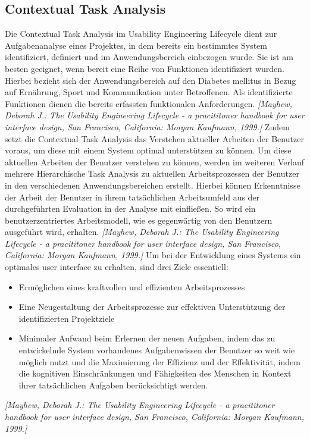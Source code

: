 \documentclass[a4paper,11pt]{article}%
\renewcommand{\\}{\vspace*{0.5\baselineskip} \newline}
\begin{document}
\subsection{Contextual Task Analysis}
	Die Contextual Task Analysis im Usability Engineering Lifecycle dient zur Aufgabenanalyse eines Projektes, in dem bereits ein bestimmtes System identifiziert, definiert und im Anwendungsbereich einbezogen wurde. Sie ist am besten geeignet, wenn bereit eine Reihe von Funktionen identifiziert wurden. Hierbei bezieht sich der Anwendungsbereich auf den Diabetes mellitus in Bezug auf Ernährung, Sport und Kommunikation unter Betroffenen. Als identifizierte Funktionen dienen die bereits erfassten funktionalen Anforderungen. \emph{[Mayhew, Deborah J.:	The Usability Engineering Lifecycle - a pracititoner handbook for user interface design, San Francisco, California: Morgan Kaufmann, 1999.]}\newline
	Zudem setzt die Contextual Task Analysis das Verstehen aktueller Arbeiten der Benutzer voraus, um diese mit einem System optimal unterstützen zu können. Um diese aktuellen Arbeiten der Benutzer verstehen zu können, werden im weiteren Verlauf mehrere Hierarchische Task Analysis zu aktuellen Arbeitsprozessen der Benutzer in den verschiedenen Anwendungsbereichen erstellt. Hierbei können Erkenntnisse der Arbeit der Benutzer in ihrem tatsächlichen Arbeitsumfeld aus der durchgeführten Evaluation in der Analyse mit einfließen. So wird ein benutzerzentriertes Arbeitsmodell, wie es gegenwärtig von den Benutzern ausgeführt wird, erhalten. \emph{[Mayhew, Deborah J.:	The Usability Engineering Lifecycle - a pracititoner handbook for user interface design, San Francisco, California: Morgan Kaufmann, 1999.]}\newline
	Um bei der Entwicklung eines Systems ein optimales user interface zu erhalten, sind drei Ziele essentiell:
	\begin{itemize}
		\item Ermöglichen eines kraftvollen und effizienten Arbeitsprozesses
		\item Eine Neugestaltung der Arbeitsprozesse zur effektiven Unterstützung der identifizierten Projektziele
		\item Minimaler Aufwand beim Erlernen der neuen Aufgaben, indem das zu entwickelnde System vorhandenes Aufgabenwissen der Benutzer so weit wie möglich nutzt und die Maximierung der Effizienz und der Effektivität, indem die kognitiven Einschränkungen und Fähigkeiten des Menschen in Kontext ihrer tatsächlichen Aufgaben berücksichtigt werden.
	\end{itemize}
 \emph{[Mayhew, Deborah J.:	The Usability Engineering Lifecycle - a pracititoner handbook for user interface design, San Francisco, California: Morgan Kaufmann, 1999.]}
	\newpage
\end{document}
